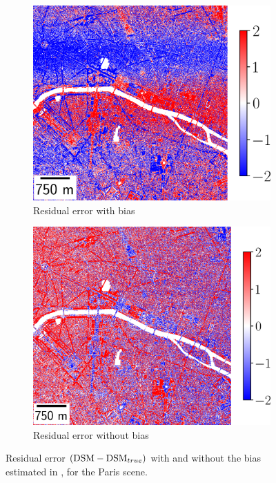 \begin{figure}
    \begin{subfigure}[t]{0.48\linewidth}
        \flushleft
        \includegraphics[width=\linewidth]{Images/Chap_6/vibrations_Paris.png}
        \caption{Residual error with bias}
        \label{fig:vibrations_Paris_with_bias}
    \end{subfigure}\hfill
    \begin{subfigure}[t]{0.48\linewidth}
        \flushright
        \includegraphics[width=\linewidth]{Images/Chap_6/vibration_corrected_Paris.png}
        \caption{Residual error without bias}
        \label{fig:vibrations_Paris_without_bias}
    \end{subfigure}
    \caption{Residual error $(\mathrm{DSM}-\mathrm{DSM}_{true})$ with and without the bias estimated in , for the Paris scene.}
    \label{fig:removed_bias_Paris}
\end{figure}


